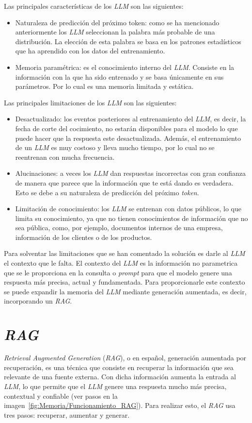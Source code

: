Las principales características de los \textit{LLM} son las siguientes:
\begin{itemize}
\tightlist
	\item Naturaleza de predicción del próximo token: como se ha mencionado anteriormente los \textit{LLM} seleccionan la palabra más probable de una distribución. La elección de esta palabra se basa en los patrones estadísticos que ha aprendido con los datos del entrenamiento.
	\item Memoria paramétrica: es el conocimiento interno del \textit{LLM}. Consiste en la información con la que ha sido entrenado y se basa únicamente en sus parámetros. Por lo cual es una memoria limitada y estática.
\end{itemize}

Las principales limitaciones de los \textit{LLM} son las siguientes:
\begin{itemize}
\tightlist
	\item Desactualizado: los eventos posteriores al entrenamiento del \textit{LLM}, es decir, la fecha de corte del cocimiento, no estarán disponibles para el modelo lo que puede hacer que la respuesta este desactualizada. Además, el entrenamiento de un \textit{LLM} es muy costoso y lleva mucho tiempo, por lo cual no se reentrenan con mucha frecuencia. 
	\item Alucinaciones: a veces los \textit{LLM} dan respuestas incorrectas con gran confianza de manera que parece que la información que te está dando es verdadera. Esto se debe a su naturaleza de predicción del próximo \textit{token}. 
	\item Limitación de conocimiento: los \textit{LLM} se entrenan con datos públicos, lo que limita su conocimiento, ya que no tienen conocimientos de información que no sea pública, como, por ejemplo, documentos internos de una empresa, información de los clientes o de los productos.
\end{itemize}

Para solventar las limitaciones que se han comentado la solución es darle al \textit{LLM} el contexto que le falta. El contexto del \textit{LLM} es la información no parametrica que se le proporciona en la consulta o \textit{prompt} para que el modelo genere una respuesta más precisa, actual y fundamentada. Para proporcionarle este contexto se puede expandir la memoria del \textit{LLM} mediante generación aumentada, es decir, incorporando un \textit{RAG}.

\section{\textit{RAG}}
\textit{Retrieval Augmented Generation} (\textit{RAG}), o en español, generación aumentada por recuperación, es una técnica que consiste en recuperar la información que sea relevante de una fuente externa. Con dicha información aumenta la entrada al \textit{LLM}, lo que permite que el \textit{LLM} genere una respuesta mucho más precisa, contextual y confiable (ver pasos en la imagen~\ref{fig:Memoria/Funcionamiento_RAG}). Para realizar esto, el \textit{RAG} usa tres pasos: recuperar, aumentar y generar. 

